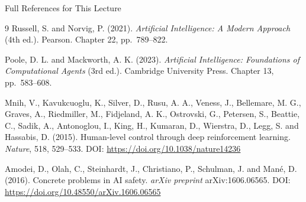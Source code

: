 \documentclass[aspectratio=169]{beamer}
\newcommand{\defaultdeckrefs}{AIMA4e Ch.22 pp.789--822; Poole3e Ch.13 pp.583--608}
\newcommand{\currentsliderefs}{\defaultdeckrefs}
\newcommand{\setslideref}[1]{\gdef\currentsliderefs{#1}}
\begin{document}
\setslideref{AIMA4e Ch.22 pp.789--822; Poole3e Ch.13 pp.583--608; doi:10.1038/nature14236; doi:10.48550/arXiv.1606.06565}
\begin{frame}[allowframebreaks]{Full References for This Lecture}
\footnotesize
\begin{thebibliography}{9}
Russell, S. and Norvig, P. (2021).
\newblock \textit{Artificial Intelligence: A Modern Approach} (4th ed.).
\newblock Pearson. Chapter 22, pp.~789--822.

Poole, D. L. and Mackworth, A. K. (2023).
\newblock \textit{Artificial Intelligence: Foundations of Computational Agents} (3rd ed.).
\newblock Cambridge University Press. Chapter 13, pp.~583--608.

Mnih, V., Kavukcuoglu, K., Silver, D., Rusu, A. A., Veness, J., Bellemare, M. G., Graves, A., Riedmiller, M., Fidjeland, A. K., Ostrovski, G., Petersen, S., Beattie, C., Sadik, A., Antonoglou, I., King, H., Kumaran, D., Wierstra, D., Legg, S. and Hassabis, D. (2015).
\newblock Human-level control through deep reinforcement learning.
\newblock \textit{Nature}, 518, 529--533.
\newblock DOI: \url{https://doi.org/10.1038/nature14236}

Amodei, D., Olah, C., Steinhardt, J., Christiano, P., Schulman, J. and Man\'{e}, D. (2016).
\newblock Concrete problems in AI safety.
\newblock \textit{arXiv preprint} arXiv:1606.06565.
\newblock DOI: \url{https://doi.org/10.48550/arXiv.1606.06565}
\end{thebibliography}
\end{frame}
\end{document}

